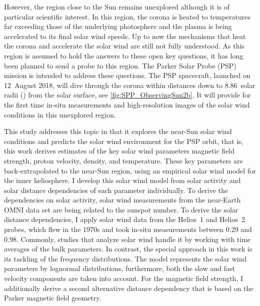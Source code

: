 However, the region close to the Sun remains unexplored although it is of particular scientific interest. In this region, the corona is heated to temperatures far exceeding those of the underlying photosphere and the plasma is being accelerated to its final solar wind speeds. Up to now the mechanisms that heat the corona and accelerate the solar wind are still not fully understood.
As this region is assumed to hold the answers to these open key questions, it has long been planned to send a probe to this region. The Parker Solar Probe (PSP) mission is intended to address these questions. The PSP spacecraft, launched on 12~August 2018, will dive through the corona within distances down to \num{8.86}~solar radii (\Rs) from the solar surface, see \autoref{fig:SPP_ObservingSun2b}. It will provide for the first time in-situ measurements and high-resolution images of the solar wind conditions in this unexplored region.
\begin{figure}[htb]
\end{figure}

This study addresses this topic in that it explores the near-Sun solar wind conditions and predicts the solar wind environment for the PSP orbit, that is, this work derives estimates of the key solar wind parameters magnetic field strength, proton velocity, density, and temperature. These key parameters are back-extrapolated to the near-Sun region, using an empirical solar wind model for the inner heliosphere.
\pagebreak
I develop this solar wind model from solar activity and solar distance dependencies of each parameter individually. To derive the dependencies on solar activity, solar wind measurements from the near-Earth OMNI data set are being related to the sunspot number. To derive the solar distance dependencies, I apply solar wind data from the Helios~1 and Helios~2 probes, which flew in the 1970s and took in-situ measurements between \SI{0.29}{\au} and \SI{0.98}{\au}.
Commonly, studies that analyze solar wind handle it by working with time averages of the bulk parameters. In contrast, the special approach in this work is its tackling of the frequency distributions. The model represents the solar wind parameters by lognormal distributions, furthermore, both the slow and fast velocity components are taken into account.
For the magnetic field strength, I additionally derive a second alternative distance dependency that is based on the Parker magnetic field geometry.

